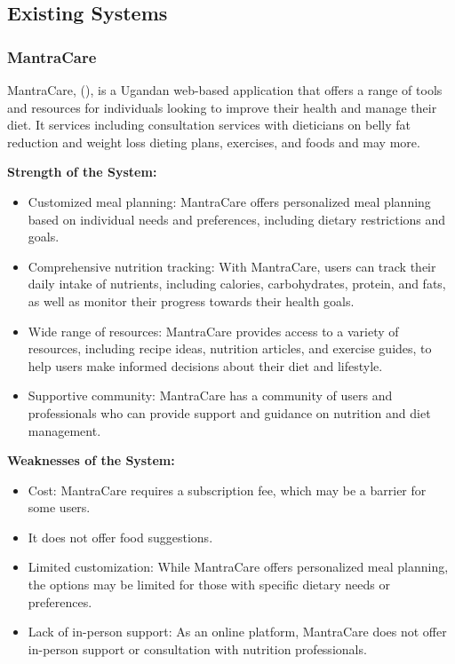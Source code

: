\documentclass{article}
\begin{document}
\subsection{Existing Systems}

\subsubsection{MantraCare}

MantraCare, (\cite{mantracare}), is a Ugandan web-based application that offers a range of tools and resources for individuals looking to improve their health and manage their diet. It services including consultation services with dieticians on belly fat reduction and weight loss dieting plans, exercises, and foods and may more.

\textbf{Strength of the System:}

\begin{itemize}

\item Customized meal planning: MantraCare offers personalized meal planning based on individual needs and preferences, including dietary restrictions and goals.
\item Comprehensive nutrition tracking: With MantraCare, users can track their daily intake of nutrients, including calories, carbohydrates, protein, and fats, as well as monitor their progress towards their health goals.
\item Wide range of resources: MantraCare provides access to a variety of resources, including recipe ideas, nutrition articles, and exercise guides, to help users make informed decisions about their diet and lifestyle.
\item Supportive community: MantraCare has a community of users and professionals who can provide support and guidance on nutrition and diet management.

\end{itemize}

\textbf{Weaknesses of the System:}

\begin{itemize}
\item Cost: MantraCare requires a subscription fee, which may be a barrier for some users.
\item It does not offer food suggestions.
\item Limited customization: While MantraCare offers personalized meal planning, the options may be limited for those with specific dietary needs or preferences.
\item Lack of in-person support: As an online platform, MantraCare does not offer in-person support or consultation with nutrition professionals.

\end{itemize}
\end{document}

